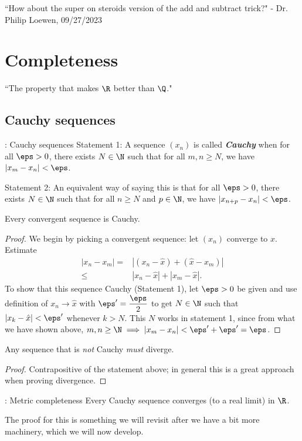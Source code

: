 \clearpage

\begin{nquote}{}
	``How about the super on steroids version of the add and subtract trick?" - Dr. Philip Loewen, 09/27/2023
\end{nquote}

\section{Completeness}
``The property that makes \(\R\) better than \(\Q\)."

\subsection{Cauchy sequences}
\begin{ndef}{: Cauchy sequences}
	Statement 1: A sequence \((x_n)\) is called \emph{\textbf{Cauchy}} when for all \(\eps>0\), there exists \(N\in\N\) such that for all \(m,n\geq N\), we have \(|x_m-x_n|<\eps\).
	
	\medskip
	
	Statement 2: An equivalent way of saying this is that for all \(\eps>0\), there exists \(N\in\N\) such that for all \(n\geq N\) and \(p\in\N\), we have \(|x_{n+p}-x_n|<\eps\).
\end{ndef}
\begin{proposition}
	Every convergent sequence is Cauchy.
\end{proposition}
\begin{proof}
	We begin by picking a convergent sequence: let \((x_n)\) converge to \(\hat{x}\). Estimate 
	\begin{align*}
		|x_n-x_m|=&|(x_n-\hat{x})+(\hat{x}-x_m)|\\
				 \leq&|x_n-\hat{x}|+|x_m-\hat{x}|.
	\end{align*}
	To show that this sequence Cauchy (Statement 1), let \(\eps>0\) be given and use definition of \(x_n\to\hat{x}\) with \(\eps'=\displaystyle\frac{\eps}{2}\) to get \(N\in\N\) such that \(|x_k-\hat{x}|<\eps'\) whenever \(k>N\). This \(N\) works in statement 1, since from what we have shown above, \(m,n\geq\N\implies |x_m-x_n|<\eps'+\eps'=\eps\). 
\end{proof}
\begin{corollary}
	Any sequence that is \emph{not} Cauchy \emph{must} diverge.
\end{corollary}
\begin{proof}
	Contrapositive of the statement above; in general this is a great approach when proving divergence.
\end{proof}
\begin{ntheorem}{: Metric completeness}
	Every Cauchy sequence converges (to a real limit) in \(\R\).
\end{ntheorem}
The proof for this is something we will revisit after we have a bit more machinery, which we will now develop.
